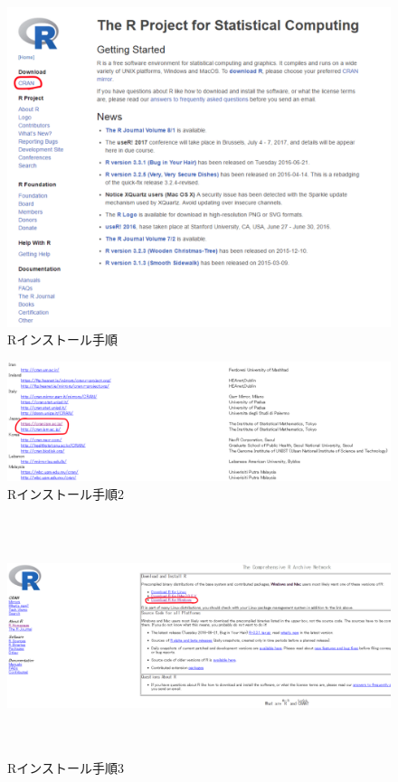 \begin{figure}[p]
\centering
\includegraphics[width=13cm]{R1.pdf}
\caption{Rインストール手順}\label{サンプル図}
\end{figure}

\begin{figure}[p]
\centering
\includegraphics[width=13cm]{R2.pdf}
\caption{Rインストール手順2}\label{サンプル図}
\end{figure}

\begin{figure}[p]
\centering
\includegraphics[height=7cm,width=13cm]{R21.pdf}
\caption{Rインストール手順3}\label{サンプル図}
\end{figure}



